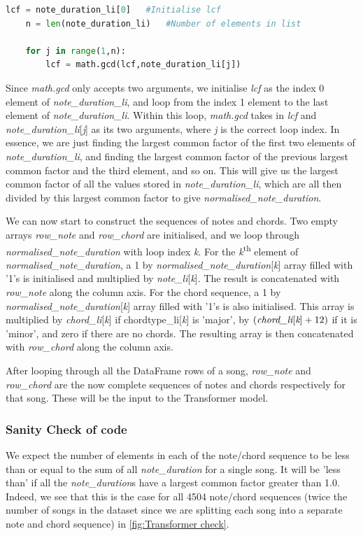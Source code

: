 \begin{lstlisting}[language=Python]
    lcf = note_duration_li[0]   #Initialise lcf
    n = len(note_duration_li)   #Number of elements in list
    
    for j in range(1,n):
        lcf = math.gcd(lcf,note_duration_li[j])
\end{lstlisting}


Since \emph{math.gcd} only accepts two arguments, we initialise \emph{lcf} as the index 0 element of \emph{note\_duration\_li}, and loop from the index 1 element to the last element of \emph{note\_duration\_li}. Within this loop, \emph{math.gcd} takes in \emph{lcf} and \emph{note\_duration\_li}[\emph{j}] as its two arguments, where \emph{j} is the correct loop index. In essence, we are just finding the largest common factor of the first two elements of \emph{note\_duration\_li}, and finding the largest common factor of the previous largest common factor and the third element, and so on. This will give us the largest common factor of all the values stored in \emph{note\_duration\_li}, which are all then divided by this largest common factor to give \emph{normalised\_note\_duration}.

We can now start to construct the sequences of notes and chords. Two empty arrays \emph{row\_note} and \emph{row\_chord} are initialised, and we loop through \emph{normalised\_note\_duration} with loop index \emph{k}. For the \emph{k}\textsuperscript{th} element of \emph{normalised\_note\_duration}, a 1 by \emph{normalised\_note\_duration}[\emph{k}] array filled with '1's is initialised and multiplied by \emph{note\_li}[\emph{k}]. The result is concatenated with \emph{row\_note} along the column axis. For the chord sequence, a 1 by \emph{normalised\_note\_duration}[\emph{k}] array filled with '1's is also initialised. This array is multiplied by \emph{chord\_li}[\emph{k}] if chordtype\_li[\emph{k}] is 'major', by $(\emph{chord\_li}[\emph{k}] + 12)$ if it is 'minor', and zero if there are no chords. The resulting array is then concatenated with \emph{row\_chord} along the column axis.

After looping through all the DataFrame rows of a song, \emph{row\_note} and \emph{row\_chord} are the now complete sequences of notes and chords respectively for that song. These will be the input to the Transformer model.

\subsubsection{Sanity Check of code}
We expect the number of elements in each of the note/chord sequence to be less than or equal to the sum of all \emph{note\_duration} for a single song. It will be 'less than' if all the \emph{note\_duration}s have a largest common factor greater than 1.0. Indeed, we see that this is the case for all 4504 note/chord sequences (twice the number of songs in the dataset since we are splitting each song into a separate note and chord sequence) in \cref{fig:Transformer check}.

